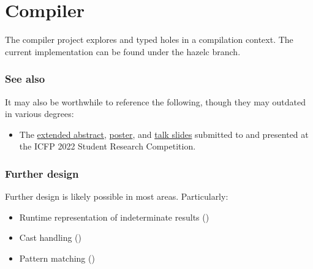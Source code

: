 \documentclass{article}
\begin{document}
\setcounter{section}{13}
\section{Compiler}
The compiler project explores \Hazel{} and typed holes in a compilation context. The current
implementation can be found under the \textsf{hazelc} branch. 

\subsubsection{See also}
\label{see-also}
It may also be worthwhile to reference the following, though they may outdated in various degrees:
%
\begin{itemize}
  \item The \href{https://github.com/hazelgrove/hazelc-icfp22-src}{extended abstract},
    \href{https://github.com/mirryi/hazelc-icfp22-poster}{poster}, and
    \href{https://github.com/mirryi/hazelc-icfp22-slides}{talk slides} submitted to and presented at
    the ICFP 2022 Student Research Competition.
\end{itemize}

\subsubsection{Further design}
\label{further-design}
Further design is likely possible in most areas. Particularly:
\begin{itemize}
  \item Runtime representation of indeterminate results ()
  \item Cast handling ()
  \item Pattern matching ()
\end{itemize}
\end{document}
